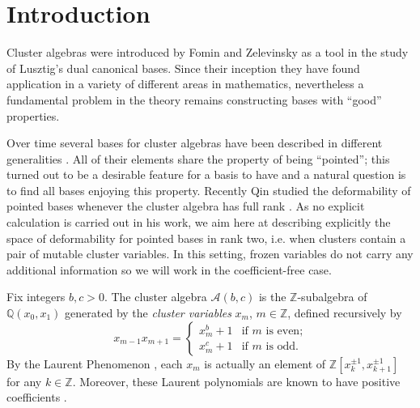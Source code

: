 \documentclass{amsart}
\numberwithin{theorem}{section}
\newcommand{\cA}{\mathcal{A}}
\newcommand{\cP}{\mathcal{P}}
\newcommand{\cS}{\mathcal{S}}
\newcommand{\QQ}{\mathbb{Q}}
\newcommand{\ZZ}{\mathbb{Z}}
\begin{document}
\begin{figure}[h!]
\end{figure}
  \section{Introduction}
  Cluster algebras were introduced by Fomin and Zelevinsky as a tool in the study of Lusztig's dual canonical bases.
  Since their inception they have found application in a variety of different areas in mathematics, nevertheless a fundamental problem in the theory remains constructing bases with ``good'' properties. 
  
  Over time several bases for cluster algebras have been described in different generalities \cite{BZ14,CI12,DT13,Dup11,Dup12,GHKK18,LLZ14,MSW13,Pla13,SZ04,T14}.
  All of their elements share the property of being ``pointed''; this turned out to be a desirable feature for a basis to have and a natural question is to find all bases enjoying this property.
  Recently Qin studied the deformability of pointed bases whenever the cluster algebra has full rank \cite{Qin19}. 
  As no explicit calculation is carried out in his work, we aim here at describing explicitly the space of deformability for pointed bases in rank two, i.e. when clusters contain a pair of mutable cluster variables.
  In this setting, frozen variables do not carry any additional information so we will work in the coefficient-free case. 

  Fix integers $b,c>0$.
  The cluster algebra $\cA(b,c)$ is the $\ZZ$-subalgebra of $\QQ(x_0,x_1)$ generated by the \emph{cluster variables} $x_m$, $m\in\ZZ$, defined recursively by
  \[
    x_{m-1}x_{m+1}=\begin{cases} x_m^b+1 & \text{if $m$ is even;}\\ x_m^c+1 & \text{if $m$ is odd.} \end{cases}
  \]
  By the Laurent Phenomenon \cite{FZ02}, each $x_m$ is actually an element of $\ZZ[x_k^{\pm1},x_{k+1}^{\pm1}]$ for any $k\in\ZZ$.
  Moreover, these Laurent polynomials are known to have positive coefficients \cite{GHKK18,LLZ14,LS15}.
\end{document}
